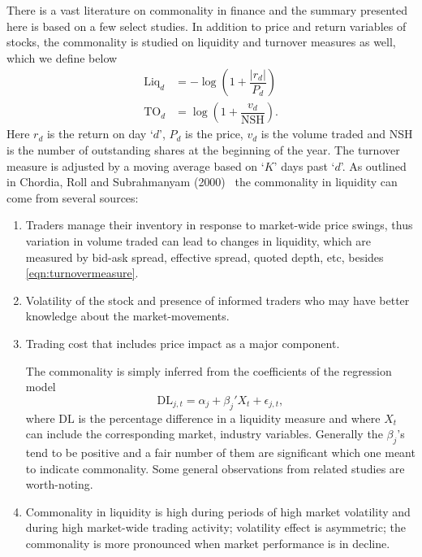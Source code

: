 There is a vast literature on commonality in finance and the summary presented here is based on a few select studies. In addition to price and return variables of stocks, the commonality is studied on liquidity and turnover measures as well, which we define below
	\begin{equation} \label{eqn:turnovermeasure}
	\begin{split}
	\text{Liq}_d&= - \log \left( 1 + \dfrac{|r_d|}{P_d} \right) \\
	\text{TO}_d&= \log \left( 1 + \dfrac{v_d}{\text{NSH}} \right).
	\end{split}
	\end{equation}
Here $r_d$ is the return on day `$d$', $P_d$ is the price, $v_d$ is the volume traded and NSH is the number of outstanding shares at the beginning of the year. The turnover measure is adjusted by a moving average based on `$K$' days past `$d$'. As outlined in Chordia, Roll and Subrahmanyam (2000)~\cite{chordia} the commonality in liquidity can come from several sources: 
	\begin{enumerate}[--]
	\item Traders manage their inventory in response to market-wide price swings, thus variation in volume traded can lead to changes in liquidity, which are measured by bid-ask spread, effective spread, quoted depth, etc, besides \eqref{eqn:turnovermeasure}.
	\item Volatility of the stock and presence of informed traders who may have better knowledge about the market-movements. 
	\item Trading cost that includes price impact as a major component. 
	
	The commonality is simply inferred from the coefficients of the regression model
		\begin{equation} \label{eqn:coefficreg}
		\text{DL}_{j,t}= \alpha_j + \beta_j' X_t + \epsilon_{j,t},
		\end{equation}
	where $\text{DL}$ is the percentage difference in a liquidity measure and where $X_t$ can include the corresponding market, industry variables. Generally the $\beta_j$'s tend to be positive and a fair number of them are significant which one meant to indicate commonality. Some general observations from related studies are worth-noting. 
	\item Commonality in liquidity is high during periods of high market volatility and during high market-wide trading activity; volatility effect is asymmetric; the commonality is more pronounced when market performance is in decline. 
	\end{enumerate}


